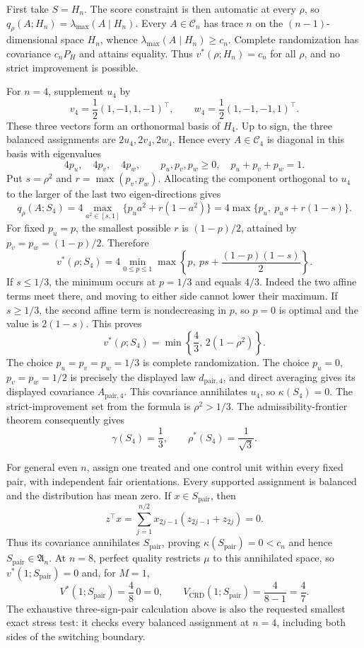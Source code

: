 First take \(S=H_n\).  The score constraint is then automatic at every \(\rho\), so \(q_\rho(A;H_n)=\lambda_{\max}(A\mid H_n)\).  Every \(A\in\mathcal C_n\) has trace \(n\) on the \((n-1)\)-dimensional space \(H_n\), whence \(\lambda_{\max}(A\mid H_n)\geq c_n\).  Complete randomization has covariance \(c_nP_H\) and attains equality.  Thus \(v^*(\rho;H_n)=c_n\) for all \(\rho\), and no strict improvement is possible.

For \(n=4\), supplement \(u_4\) by
\[
v_4=\frac12(1,-1,1,-1)^\top,
\qquad w_4=\frac12(1,-1,-1,1)^\top.
\]
These three vectors form an orthonormal basis of \(H_4\).  Up to sign, the three balanced assignments are \(2u_4,2v_4,2w_4\).  Hence every \(A\in\mathcal C_4\) is diagonal in this basis with eigenvalues
\[
4p_u,\quad4p_v,\quad4p_w,
\qquad p_u,p_v,p_w\geq0,\quad p_u+p_v+p_w=1.
\]
Put \(s=\rho^2\) and \(r=\max(p_v,p_w)\).  Allocating the component orthogonal to \(u_4\) to the larger of the last two eigen-directions gives
\[
q_\rho(A;S_4)
=4\max_{a^2\in[s,1]}\{p_u a^2+r(1-a^2)\}
=4\max\{p_u,\ p_us+r(1-s)\}.
\]
For fixed \(p_u=p\), the smallest possible \(r\) is \((1-p)/2\), attained by \(p_v=p_w=(1-p)/2\).  Therefore
\[
v^*(\rho;S_4)
=4\min_{0\leq p\leq1}
\max\left\{p,\ ps+\frac{(1-p)(1-s)}2\right\}.
\]
If \(s\leq1/3\), the minimum occurs at \(p=1/3\) and equals \(4/3\).  Indeed the two affine terms meet there, and moving to either side cannot lower their maximum.  If \(s\geq1/3\), the second affine term is nondecreasing in \(p\), so \(p=0\) is optimal and the value is \(2(1-s)\).  This proves
\[
v^*(\rho;S_4)=\min\left\{\frac43,\,2(1-\rho^2)\right\}.
\]
The choice \(p_u=p_v=p_w=1/3\) is complete randomization.  The choice \(p_u=0\), \(p_v=p_w=1/2\) is precisely the displayed law \(d_{\mathrm{pair},4}\), and direct averaging gives its displayed covariance \(A_{\mathrm{pair},4}\).  This covariance annihilates \(u_4\), so \(\kappa(S_4)=0\).  The strict-improvement set from the formula is \(\rho^2>1/3\).  The admissibility-frontier theorem consequently gives
\[
\gamma(S_4)=\frac13,
\qquad \rho^*(S_4)=\frac1{\sqrt3}.
\]

For general even \(n\), assign one treated and one control unit within every fixed pair, with independent fair orientations.  Every supported assignment is balanced and the distribution has mean zero.  If \(x\in S_{\mathrm{pair}}\), then
\[
z^\top x=\sum_{j=1}^{n/2}x_{2j-1}(z_{2j-1}+z_{2j})=0.
\]
Thus its covariance annihilates \(S_{\mathrm{pair}}\), proving \(\kappa(S_{\mathrm{pair}})=0<c_n\) and hence \(S_{\mathrm{pair}}\in\mathfrak A_n\).  At \(n=8\), perfect quality restricts \(\mu\) to this annihilated space, so \(v^*(1;S_{\mathrm{pair}})=0\) and, for \(M=1\),
\[
V^*(1;S_{\mathrm{pair}})=\frac{4}{8}\,0=0,
\qquad V_{\mathrm{CRD}}(1;S_{\mathrm{pair}})=\frac4{8-1}=\frac47.
\]
The exhaustive three-sign-pair calculation above is also the requested smallest exact stress test: it checks every balanced assignment at \(n=4\), including both sides of the switching boundary.
